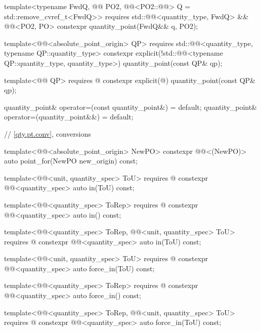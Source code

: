 \begin{codeblock}
{{  template<typename FwdQ, @@ PO2,
           @@<PO2::@@> Q = std::remove_cvref_t<FwdQ>>
    requires std::@@<quantity_type, FwdQ> && @@<PO2, PO>
  constexpr quantity_point(FwdQ&& q, PO2);

  template<@@<absolute_point_origin> QP>
    requires std::@@<quantity_type, typename QP::quantity_type>
  constexpr explicit(!std::@@<typename QP::quantity_type, quantity_type>)
    quantity_point(const QP& qp);

  template<@@ QP>
    requires @\seebelownc@
  constexpr explicit(@\seebelownc@) quantity_point(const QP& qp);

  quantity_point& operator=(const quantity_point&) = default;
  quantity_point& operator=(quantity_point&&) = default;

  // \ref{qty.pt.conv}, conversions

  template<@@<absolute_point_origin> NewPO>
  constexpr @@<(NewPO{})> auto point_for(NewPO new_origin) const;

  template<@@<unit, quantity_spec> ToU>
    requires @\seebelownc@
  constexpr @@<quantity_spec> auto in(ToU) const;

  template<@@<quantity_spec> ToRep>
    requires @\seebelownc@
  constexpr @@<quantity_spec> auto in() const;

  template<@@<quantity_spec> ToRep,
           @@<unit, quantity_spec> ToU>
    requires @\seebelownc@
  constexpr @@<quantity_spec> auto in(ToU) const;

  template<@@<unit, quantity_spec> ToU>
    requires @\seebelownc@
  constexpr @@<quantity_spec> auto force_in(ToU) const;

  template<@@<quantity_spec> ToRep>
    requires @\seebelownc@
  constexpr @@<quantity_spec> auto force_in() const;

  template<@@<quantity_spec> ToRep,
           @@<unit, quantity_spec> ToU>
    requires @\seebelownc@
  constexpr @@<quantity_spec> auto force_in(ToU) const;

}}
\end{codeblock}
